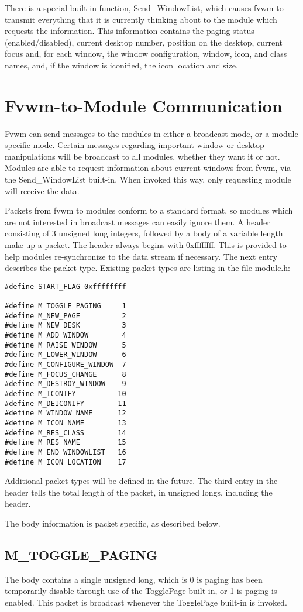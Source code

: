 There is a special built-in function, Send\_WindowList, which causes
fvwm to transmit everything that it is currently thinking about to
the module which requests the information. This information contains
the paging status (enabled/disabled), current desktop number, position
on the desktop, current focus and, for each window, the window
configuration, window, icon, and class names, and, if the window is
iconified, the icon location and size.

\section{Fvwm-to-Module Communication}
Fvwm
can send messages to the modules in either a broadcast mode, or a
module specific mode. Certain messages regarding important window or
desktop manipulations will be broadcast to all modules, whether they 
want it or not. Modules are able to request information about current windows
from fvwm, via the Send\_WindowList built-in. When invoked this way,
only requesting module will receive the data.

Packets from fvwm to modules conform to a standard format, so modules
which are not interested in broadcast messages can easily ignore them.
A header consisting of 3 unsigned long integers, followed by a body of
a variable length make up a packet. The header always begins with
0xffffffff. This is provided to help modules re-synchronize to the
data stream if necessary. The next entry describes the packet type.
Existing packet types are listing in the file module.h:
\begin{verbatim}
#define START_FLAG 0xffffffff

#define M_TOGGLE_PAGING     1
#define M_NEW_PAGE          2
#define M_NEW_DESK          3
#define M_ADD_WINDOW        4
#define M_RAISE_WINDOW      5
#define M_LOWER_WINDOW      6
#define M_CONFIGURE_WINDOW  7
#define M_FOCUS_CHANGE      8
#define M_DESTROY_WINDOW    9
#define M_ICONIFY          10
#define M_DEICONIFY        11
#define M_WINDOW_NAME      12
#define M_ICON_NAME        13
#define M_RES_CLASS        14
#define M_RES_NAME         15
#define M_END_WINDOWLIST   16
#define M_ICON_LOCATION    17
\end{verbatim}

Additional packet types will be defined in the future. The third entry
in the header tells the total length of the packet, in unsigned longs,
including the header.

The body information is packet specific, as described below.
\subsection{M\_TOGGLE\_PAGING}
The body contains a single unsigned long, which is 0 is paging has
been temporarily disable through use of the TogglePage built-in, or 1
is paging is enabled. This packet is broadcast whenever the TogglePage
built-in is invoked.

